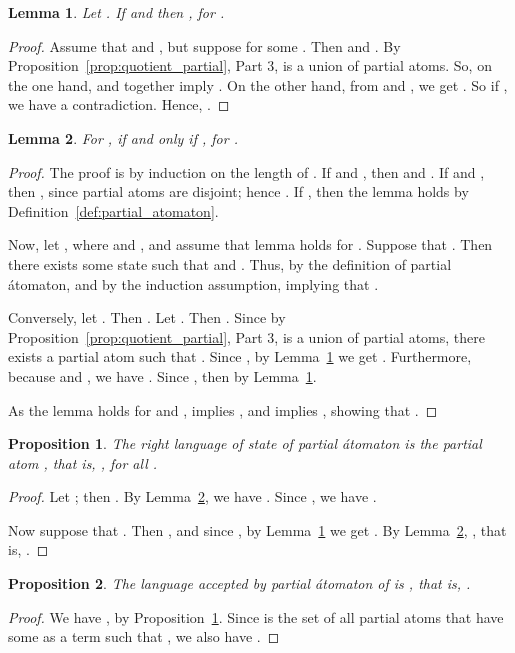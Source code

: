 \documentclass[preprint,12pt]{elsarticle}
\newtheorem{proposition}{Proposition}
\newtheorem{lemma}{Lemma}
\begin{document}
\begin{lemma}
\label{lem:inclusion_partial}
Let .
If  and  then , for .
\end{lemma}
\begin{proof}
Assume that  and , but suppose  for some  
. 
Then  and .
By Proposition~\ref{prop:quotient_partial}, Part 3,  is a union of 
partial atoms. So, on the one hand,  and  together imply 
. On the other hand, from  and , 
we get . So if , we have a contradiction.
Hence, . 
\end{proof}

\begin{lemma}
\label{lem:path_partial}
For , 
 if and only if 
, for .
\end{lemma}
\begin{proof}  
The proof is by induction on the length of . 
If  and , then  and 
. If  and , then , 
since partial atoms are disjoint; hence .
If , then the lemma holds by Definition~\ref{def:partial_atomaton}.  

Now, let , where  and , and assume that 
lemma holds for . 
Suppose that .
Then there exists some state  such that
  and 
.
Thus,   by the definition of partial \'atomaton, 
and  by the induction assumption, implying that
.
 
Conversely, let . Then .
Let . Then . 
Since by Proposition~\ref{prop:quotient_partial}, Part 3,  is a union 
of partial atoms, there exists a partial atom  such that .
Since ,  by Lemma~\ref{lem:inclusion_partial} we get 
.
Furthermore, because  and , we have 
. Since , then  by 
Lemma~\ref{lem:inclusion_partial}.

As the lemma holds for  and ,  implies
, and 
 implies
, showing that
.
\end{proof}

\begin{proposition}
\label{prop:right_lang_partial}
The right language of state  of partial \'atomaton  is 
the partial atom , that is, 
, for all .
\end{proposition}
\begin{proof}  
Let ; then 
.
By Lemma~\ref{lem:path_partial}, we have .  
Since ,  we have . 

Now suppose that . Then , and since ,
by Lemma~\ref{lem:inclusion_partial} we get . 
By Lemma~\ref{lem:path_partial}, 
, that is, 
. 
\end{proof}

\begin{proposition}
\label{prop:lang_partial_atomaton}
The language accepted by partial \'atomaton  of  is ,
that is, .
\end{proposition}
\begin{proof}
We have , by Proposition~\ref{prop:right_lang_partial}.
Since  is the set of all partial atoms that have some  as a term 
such that , we also have . 
\end{proof}
\end{document}
